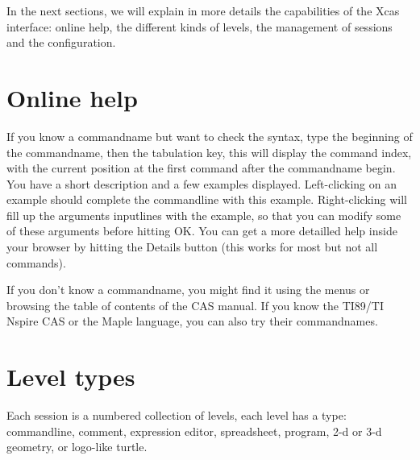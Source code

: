 \documentclass{article}
\begin{document}
In the next sections, we will explain in more details the
capabilities of the Xcas interface: online help,
the different kinds of levels,
the management of sessions and the configuration.

\section{Online help}
If you know a commandname but want to check the syntax, type the 
beginning of the commandname, then the tabulation key, this will
display the command index, with the current position at the first
command after the commandname begin. You have a short description
and a few examples displayed. Left-clicking on an example should
complete the commandline with this example. Right-clicking will
fill up the arguments inputlines with the example, so that you
can modify some of these arguments before hitting OK.
You can get a more detailled help inside your browser 
by hitting the Details button (this works for most but not all commands).

If you don't know a commandname, you might find it using the
menus or browsing the table of contents of the CAS manual. If you
know the TI89/TI Nspire CAS or the Maple language, you can 
also try their commandnames.

\section{Level types}
Each session is a numbered collection of levels, each level 
has a type: commandline, comment, expression editor,
spreadsheet, program, 2-d or
3-d geometry, or logo-like turtle.
\end{document}
